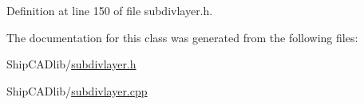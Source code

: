 Definition at line 150 of file subdivlayer.\-h.



The documentation for this class was generated from the following files\-:\begin{DoxyCompactItemize}
\item 
Ship\-C\-A\-Dlib/\hyperlink{subdivlayer_8h}{subdivlayer.\-h}\item 
Ship\-C\-A\-Dlib/\hyperlink{subdivlayer_8cpp}{subdivlayer.\-cpp}\end{DoxyCompactItemize}
